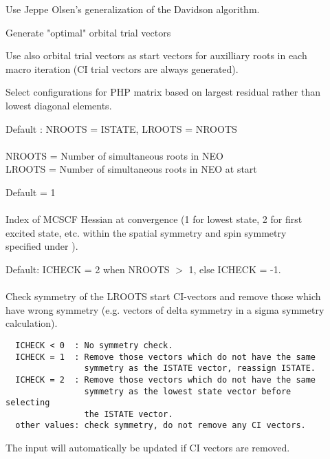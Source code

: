\begin{description}
\item[]
  Use Jeppe Olsen's generalization of the Davidson
  algorithm.
 
\item[]
  Generate "optimal" orbital trial vectors
 
\item[]
  Use also orbital trial vectors as start vectors for auxilliary roots
  in each macro iteration (CI trial vectors are always generated).
 
\item[]
  Select configurations for PHP matrix based on largest residual
  rather than lowest diagonal elements.
 
\item[]
  Default : NROOTS = ISTATE, LROOTS = NROOTS\\
   \\
  NROOTS = Number of simultaneous roots in NEO\\
  LROOTS = Number of simultaneous roots in NEO at start
 
\item[]
  Default = 1\\
   \\
  Index of MCSCF Hessian at convergence (1 for
  lowest state, 2 for first 
  excited state, etc. within the spatial symmetry and
  spin symmetry
  specified under ).
 
\item[]
  Default: ICHECK = 2 when NROOTS $>$ 1, else ICHECK = -1.\\
   \\
  Check symmetry of the LROOTS start CI-vectors and remove those which
  have wrong symmetry (e.g. vectors of delta symmetry in a sigma
  symmetry calculation).
\begin{verbatim}
  ICHECK < 0  : No symmetry check.
  ICHECK = 1  : Remove those vectors which do not have the same
                symmetry as the ISTATE vector, reassign ISTATE.
  ICHECK = 2  : Remove those vectors which do not have the same
                symmetry as the lowest state vector before selecting
                the ISTATE vector.
  other values: check symmetry, do not remove any CI vectors.
\end{verbatim}
  The  input will automatically be
  updated if CI vectors are removed.
 

\end{description}
